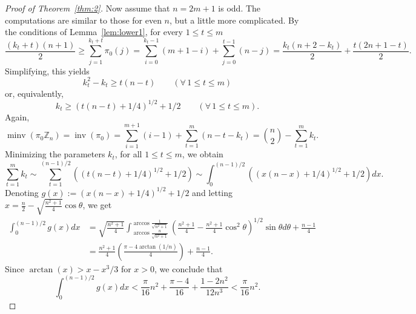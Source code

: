 \documentclass[11pt]{amsart}
\numberwithin{equation}{section}
\newcommand{\todo}[1]{\vspace{5 mm}\par \noindent
\marginpar{\textsc{ToDo}} \framebox{\begin{minipage}[c]{0.95
\textwidth}
 #1 \end{minipage}}\vspace{5 mm}\par}
\newcommand{\ZZ}{{\mathbb {Z}}}
\newcommand{\inv}{{\operatorname{inv}}}
\newcommand{\minv}{{\operatorname{minv}}}
\begin{document}
\begin{proof}[Proof of Theorem~\ref{thm:2}]
Now assume that $n = 2m+1$ is odd. 
The computations are similar to those for even $n$, 
but a little more complicated.
%
%
By the conditions of Lemma~\ref{lem:lower1}, for every 
$1 \le t \le m$
\[
    \frac{(k_t+t)(n+1)}{2}
    \ge \sum_{j=1}^{k_t+t} \pi_0(j)
    = \sum_{i=0}^{k_t-1} \left( m+1-i \right) + \sum_{j=0}^{t-1} \left( n-j \right)
    = \frac{k_t (n+2-k_t)}{2} + \frac{t (2n+1-t)}{2}.
\]
Simplifying, this yields 
\[
    k_t^2 - k_t \ge t(n-t)
    \qquad (\forall\, 1\le t \le m)
\]
or, equivalently,
\[
    k_t \ge (t(n-t) +1/4)^{1/2} + 1/2
    \qquad (\forall\, 1\le t \le m).
\]
Again,
\[
    \minv(\pi_0\ZZ_n)
    = \inv(\pi_0)
    = \sum_{i=1}^{m+1} (i-1) + \sum_{t=1}^{m}(n-t-k_t)
    = \binom{n}{2} - \sum_{t=1}^{m} k_t.
\]
Minimizing the parameters $k_t$, for all $1\le t\le m$, we obtain
\[
    \sum_{t=1}^{m} k_t
    \sim \sum_{t=1}^{(n-1)/2} \left( (t(n-t) + 1/4)^{1/2} + 1/2 \right)
    \sim \int_0^{(n-1)/2} \left( (x(n-x) + 1/4)^{1/2} + 1/2 \right) dx.
\]
Denoting $g(x) := (x(n-x) + 1/4)^{1/2} + 1/2$ and letting $x = \frac{n}{2} - \sqrt{\frac{n^2 + 1}{4}} \cos\theta$, we get 
\begin{align*}
    \int_{0}^{(n-1)/2} g(x) dx
    &= \sqrt{\frac{n^2 + 1}{4}} \int_{\arccos \frac{n}{\sqrt{n^2 + 1}}}^{\arccos \frac{1}{\sqrt{n^2 + 1}}} \left( \frac{n^2 + 1}{4} - \frac{n^2 + 1}{4} \cos^2 \theta \right)^{1/2} \sin\theta d\theta 
    + \frac{n-1}{4} \\
    &= \frac{n^2 + 1}{4} \left( \frac{\pi - 4 \arctan(1/n)}{4} \right) 
    + \frac{n-1}{4} .
\end{align*}
Since $\arctan(x) > x - x^3/3$ for $x > 0$, we conclude that
\[ 
    \int_{0}^{(n-1)/2} g(x) dx
    < \frac{\pi}{16} n^2 + \frac{\pi - 4}{16} + \frac{1 - 2n^2}{12n^3}
    < \frac{\pi}{16} n^2 .
\]


\end{proof}
\end{document}
